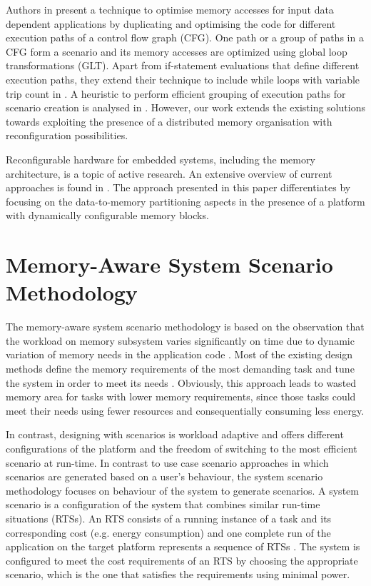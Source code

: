 \documentclass[a4paper,conference]{IEEEtran}
\begin{document}
Authors in \cite{Pal06} present a technique to optimise memory accesses for input data dependent applications by duplicating and optimising the code for different execution paths of a control flow graph (CFG). One path or a group of paths in a CFG form a scenario and its memory accesses are optimized using global loop transformations (GLT). Apart from if-statement evaluations that define different execution paths, they extend their technique to include while loops with variable trip count in \cite{Pal06b}. A heuristic to perform efficient grouping of execution paths for scenario creation is analysed in \cite{Pal07}. However, our work extends the existing solutions towards exploiting the presence of a distributed memory organisation with reconfiguration possibilities.

Reconfigurable hardware for embedded systems, including the memory architecture, is a topic of active research. An extensive overview of current approaches is found in \cite{Garcia}. The approach presented in this paper differentiates by focusing on the data-to-memory partitioning aspects in the presence of a platform with dynamically configurable memory blocks. 

\section{Memory-Aware System Scenario Methodology}
\label{sec:methodology}

The memory-aware system scenario methodology is based on the observation that the workload on memory subsystem varies significantly on time due to dynamic variation of memory needs in the application code \cite{Fil12}. Most of the existing design methods define the memory requirements of the most demanding task and tune the system in order to meet its needs \cite{tcm}. Obviously, this approach leads to wasted memory area for tasks with lower memory requirements, since those tasks could meet their needs using fewer resources and consequentially consuming less energy. 

In contrast, designing with scenarios is workload adaptive and offers different configurations of the platform and the freedom of switching to the most efficient scenario at run-time. In contrast to use case scenario approaches in which scenarios are generated based on a user's behaviour, the system scenario methodology focuses on behaviour of the system to generate scenarios. A system scenario is a configuration of the system that combines similar run-time situations (RTSs). An RTS consists of a running instance of a task and its corresponding cost (e.g. energy consumption) and one complete run of the application on the target platform represents a sequence of RTSs \cite{Elena2010}. The system is configured to meet the cost requirements of an RTS by choosing the appropriate scenario, which is the one that satisfies the requirements using minimal power.
\end{document}
